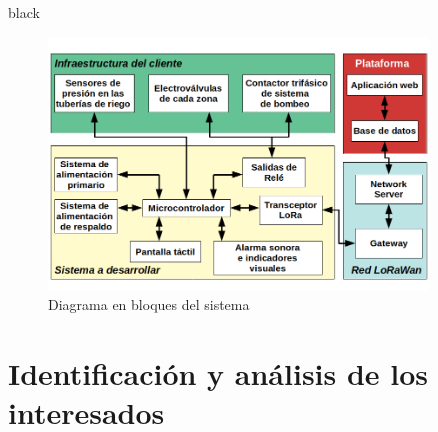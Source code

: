 \documentclass[11pt]{charter}
\begin{document}
\begin{consigna}{black}
\begin{figure}[htpb]
\centering 
\includegraphics[width=0.9\textwidth]{./Figuras/DiagramaBloques.png}
\caption{Diagrama en bloques del sistema}

\label{fig:diagBloques}
\end{figure}

\vspace{25px}

\end{consigna}


\section{Identificación y análisis de los interesados}
\label{sec:interesados}
\end{document}
